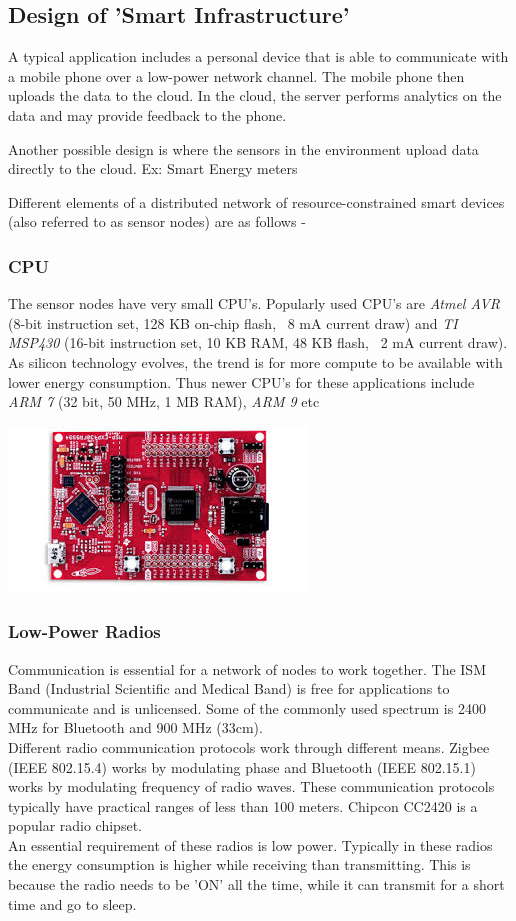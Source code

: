 \documentclass[twoside]{article}
\begin{document}
\subsection{Design of 'Smart Infrastructure'}
A typical application includes a personal device that is able to communicate with a mobile phone over a low-power network channel. The mobile phone then uploads the data to the cloud. In the cloud, the server performs analytics on the data and may provide feedback to the phone.

Another possible design is where the sensors in the environment upload data directly to the cloud. Ex: Smart Energy meters

Different elements of a distributed network of resource-constrained smart devices (also referred to as sensor nodes) are as follows -  
\subsubsection{CPU}
The sensor nodes have very small CPU's. Popularly used CPU's are \textit{Atmel AVR} (8-bit instruction set, 128 KB on-chip flash, ~8 mA current draw) and \textit{TI MSP430} (16-bit instruction set, 10 KB RAM, 48 KB flash, ~2 mA current draw). As silicon technology evolves, the trend is for more compute to be available with lower energy consumption. Thus newer CPU's for these applications include \textit{ARM 7} (32 bit, 50 MHz, 1 MB RAM), \textit{ARM 9} etc

\begin{center}
    \includegraphics[scale=0.5]{msp430.jpeg}   
\end{center}


\subsubsection{Low-Power Radios}
Communication is essential for a network of nodes to work together. The ISM Band (Industrial Scientific and Medical Band) is free for applications to communicate and is unlicensed. Some of the commonly used spectrum is 2400 MHz for Bluetooth and 900 MHz (33cm). \\
Different radio communication protocols work through different means. Zigbee (IEEE 802.15.4) works by modulating phase and Bluetooth (IEEE 802.15.1) works by modulating frequency of radio waves.
These communication protocols typically have practical ranges of less than 100 meters. Chipcon CC2420 is a popular radio chipset. \\
An essential requirement of these radios is low power. Typically in these radios the energy consumption is higher while receiving than transmitting. This is because the radio needs to be 'ON' all the time, while it can transmit for a short time and go to sleep.
\end{document}
